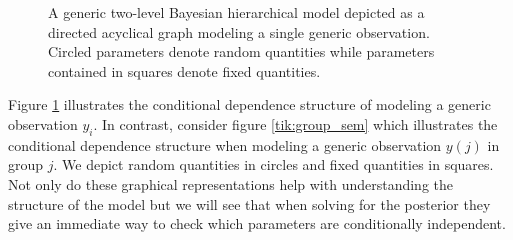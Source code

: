 \begin{figure}[!ht]
\begin{center}
\end{center}
\label{tik:general_sem}
\caption{A generic two-level Bayesian hierarchical model depicted as a directed acyclical graph modeling a single generic observation. Circled parameters denote random quantities while parameters contained in squares denote fixed quantities.}
\end{figure}


Figure \ref{tik:general_sem} illustrates the conditional dependence structure of modeling a generic observation $y_i$.
In contrast, consider figure \ref{tik:group_sem} which illustrates the conditional dependence structure when modeling a generic observation $y(j)$ in group $j$.
We depict random quantities in circles and fixed quantities in squares.
Not only do these graphical representations help with understanding the structure of the model but we will see that when solving for the posterior they give an immediate way to check which parameters are conditionally independent.

